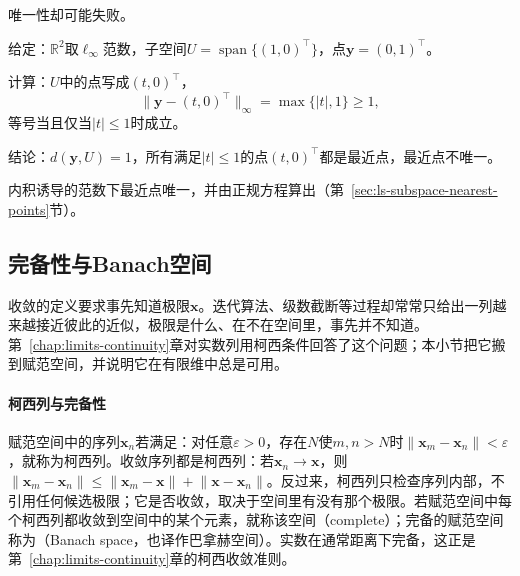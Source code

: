 唯一性却可能失败。
\begin{example}
\label{ex:ls-linf-nonunique-nearest}
给定：$\mathbb R^2$取$\ell_\infty$范数，子空间$U=\operatorname{span}\{(1,0)^\top\}$，点$\bm y=(0,1)^\top$。

计算：$U$中的点写成$(t,0)^\top$，
\[
 \lVert\bm y-(t,0)^\top\rVert_\infty=\max\{|t|,1\}\geq1,
\]
等号当且仅当$|t|\leq1$时成立。

结论：$d(\bm y,U)=1$，所有满足$|t|\leq1$的点$(t,0)^\top$都是最近点，最近点不唯一。
\end{example}
内积诱导的范数下最近点唯一，并由正规方程算出（第~\ref{sec:ls-subspace-nearest-points}节）。

\subsection{完备性与Banach空间}
\label{sec:ls-banach-spaces}

收敛的定义要求事先知道极限$\bm x$。迭代算法、级数截断等过程却常常只给出一列越来越接近彼此的近似，极限是什么、在不在空间里，事先并不知道。第~\ref{chap:limits-continuity}章对实数列用柯西条件回答了这个问题；本小节把它搬到赋范空间，并说明它在有限维中总是可用。

\paragraph{柯西列与完备性}
赋范空间中的序列$\bm x_n$若满足：对任意$\varepsilon>0$，存在$N$使$m,n>N$时$\lVert\bm x_m-\bm x_n\rVert<\varepsilon$，就称为柯西列。收敛序列都是柯西列：若$\bm x_n\to\bm x$，则$\lVert\bm x_m-\bm x_n\rVert\leq\lVert\bm x_m-\bm x\rVert+\lVert\bm x-\bm x_n\rVert$。反过来，柯西列只检查序列内部，不引用任何候选极限；它是否收敛，取决于空间里有没有那个极限。若赋范空间中每个柯西列都收敛到空间中的某个元素，就称该空间（complete）；完备的赋范空间称为（Banach space，也译作巴拿赫空间）。实数在通常距离下完备，这正是第~\ref{chap:limits-continuity}章的柯西收敛准则。

